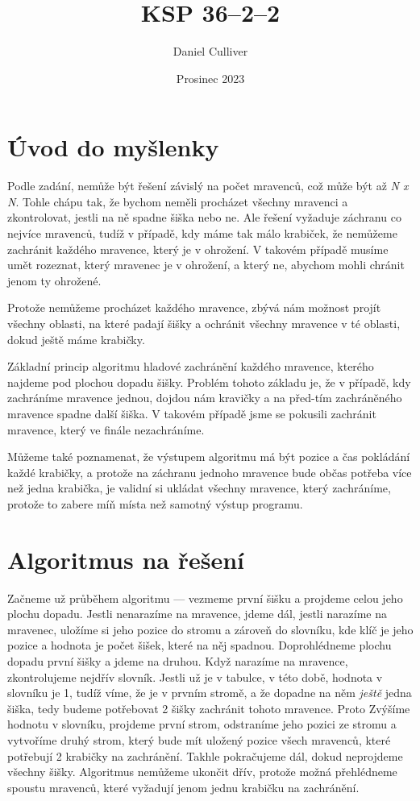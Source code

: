 \documentclass{../../../ksp}
\title{KSP 36--2--2}
\author{Daniel Culliver}
\date{Prosinec 2023}
\begin{document}
\maketitle

\section*{Úvod do myšlenky}

Podle zadání, nemůže být řešení závislý na počet mravenců, což může být až \emph{N x N}.
Tohle chápu tak, že bychom neměli procházet všechny mravenci a zkontrolovat, jestli na ně spadne šiška nebo ne.
Ale řešení vyžaduje záchranu co nejvíce mravenců, tudíž v případě, kdy máme tak málo krabiček, že nemůžeme zachránit
každého mravence, který je v ohrožení. V takovém případě musíme umět rozeznat, který mravenec je v ohrožení, a který ne,
abychom mohli chránit jenom ty ohrožené.

Protože nemůžeme procházet každého mravence, zbývá nám možnost projít všechny oblasti, na které padají šišky a ochránit všechny mravence
v té oblasti, dokud ještě máme krabičky.

Základní princip algoritmu hladové zachránění každého mravence, kterého najdeme pod plochou dopadu šišky. Problém tohoto základu je, že
v případě, kdy zachráníme mravence jednou, dojdou nám kravičky a na před-tím zachráněného mravence spadne další šiška. V takovém případě jsme
se pokusili zachránit mravence, který ve finále nezachráníme.

Můžeme také poznamenat, že výstupem algoritmu má být pozice a čas pokládání každé krabičky, a protože na záchranu jednoho mravence bude občas potřeba
více než jedna krabička, je validní si ukládat všechny mravence, který zachráníme, protože to zabere míň místa než samotný výstup programu.

\section*{Algoritmus na řešení}

Začneme už průběhem algoritmu --- vezmeme první šišku a projdeme celou jeho plochu dopadu. Jestli nenarazíme na mravence, jdeme dál,
jestli narazíme na mravenec, uložíme si jeho pozice do stromu a zároveň do slovníku, kde klíč je jeho pozice a hodnota je počet šišek, které na něj spadnou.
Doprohlédneme plochu dopadu první šišky a jdeme na druhou. Když narazíme na mravence, zkontrolujeme nejdřív slovník. Jestli už je v tabulce, v této
době, hodnota v slovníku je 1, tudíž víme, že je v prvním stromě, a že dopadne na něm \emph{ještě} jedna šiška,
tedy budeme potřebovat 2 šišky zachránit tohoto mravence. Proto Zvýšíme hodnotu v slovníku, projdeme první strom, odstraníme jeho pozici ze stromu a vytvoříme druhý strom,
který bude mít uložený pozice všech mravenců, které potřebují 2 krabičky na zachránění.
Takhle pokračujeme dál, dokud neprojdeme všechny šišky. Algoritmus nemůžeme ukončit dřív, protože možná přehlédneme spoustu mravenců,
které vyžadují jenom jednu krabičku na zachránění.
\end{document}
